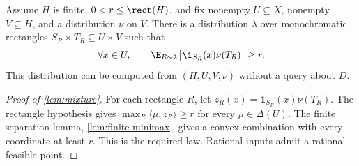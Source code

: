 \begin{lemma}\label{lem:mixture}
Assume $H$ is finite, $0<r\le\rect(H)$, and fix nonempty $U\subseteq X$, nonempty $V\subseteq H$, and a distribution $\nu$ on $V$. There is a distribution $\lambda$ over monochromatic rectangles $S_R\times T_R\subseteq U\times V$ such that
\begin{equation}\label{eq:coverage}
 \forall x\in U,\qquad
 \E_{R\sim\lambda}\bigl[\1_{S_R}(x)\nu(T_R)\bigr]\ge r.
\end{equation}
This distribution can be computed from $(H,U,V,\nu)$ without a query about $D$.
\end{lemma}

\begin{proof}[Proof of \cref{lem:mixture}]
For each rectangle $R$, let $z_R(x)=\mathbf1_{S_R}(x)\nu(T_R)$. The rectangle hypothesis gives $\max_R\langle\mu,z_R\rangle\ge r$ for every $\mu\in\Delta(U)$. The finite separation lemma, \cref{lem:finite-minimax}, gives a convex combination with every coordinate at least $r$. This is the required law. Rational inputs admit a rational feasible point.
\end{proof}
